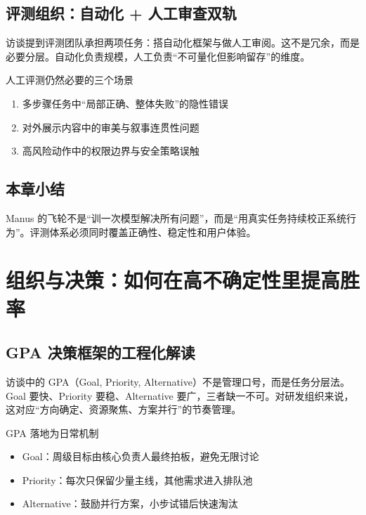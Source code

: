 \documentclass[a4paper]{article}
\begin{document}
\subsection{评测组织：自动化 + 人工审查双轨}

访谈提到评测团队承担两项任务：搭自动化框架与做人工审阅。这不是冗余，而是必要分层。自动化负责规模，人工负责“不可量化但影响留存”的维度。

\begin{knowledgebox}{人工评测仍然必要的三个场景}
\begin{enumerate}
    \item 多步骤任务中“局部正确、整体失败”的隐性错误
    \item 对外展示内容中的审美与叙事连贯性问题
    \item 高风险动作中的权限边界与安全策略误触
\end{enumerate}
\end{knowledgebox}

\subsection{本章小结}

Manus 的飞轮不是“训一次模型解决所有问题”，而是“用真实任务持续校正系统行为”。评测体系必须同时覆盖正确性、稳定性和用户体验。


\section{组织与决策：如何在高不确定性里提高胜率}

\subsection{GPA 决策框架的工程化解读}

访谈中的 GPA（Goal, Priority, Alternative）不是管理口号，而是任务分层法。Goal 要快、Priority 要稳、Alternative 要广，三者缺一不可。对研发组织来说，这对应“方向确定、资源聚焦、方案并行”的节奏管理。

\begin{importantbox}{GPA 落地为日常机制}
\begin{itemize}
    \item Goal：周级目标由核心负责人最终拍板，避免无限讨论
    \item Priority：每次只保留少量主线，其他需求进入排队池
    \item Alternative：鼓励并行方案，小步试错后快速淘汰
\end{itemize}
\end{importantbox}
\end{document}
